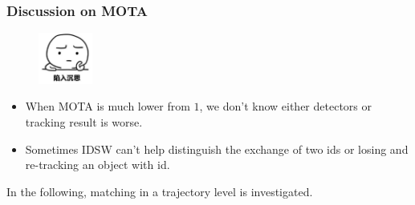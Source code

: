 \documentclass[slidetop, mathserif]{beamer}
\begin{document}
\begin{frame}
	\frametitle{Discussion on MOTA}

	\begin{minipage}{50pt}
		\begin{figure}
			\includegraphics[width=50pt]{pics/question2.png}
		\end{figure}
	\end{minipage}
	\begin{minipage}{250pt}
	\begin{itemize}
	\item When MOTA is much lower from $1$, we don't know either detectors or tracking result is worse.
	\item Sometimes IDSW can't help distinguish the exchange of two ids or
		losing and re-tracking an object with id.
	\end{itemize}
	\end{minipage}

	\vspace{10pt}

	In the following, matching in a trajectory level is investigated.

\end{frame}

\end{document}
